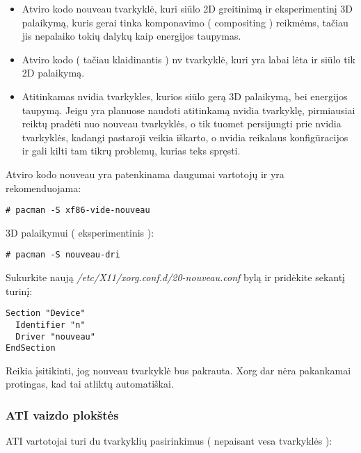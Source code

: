         \begin{itemize}
          \item Atviro kodo nouveau tvarkyklė, kuri siūlo 2D
            greitinimą ir eksperimentinį 3D palaikymą, kuris gerai
            tinka komponavimo ( compositing ) reikmėms, tačiau jis
            nepalaiko tokių dalykų kaip energijos taupymas.
          \item Atviro kodo ( tačiau klaidinantis ) nv tvarkyklė,
            kuri yra labai lėta ir siūlo tik 2D palaikymą.
          \item Atitinkamas nvidia tvarkykles, kurios siūlo gerą 3D
            palaikymą, bei energijos taupymą. Jeigu yra planuose
            naudoti atitinkamą nvidia tvarkyklę, pirmiausiai reiktų
            pradėti nuo nouveau tvarkyklės, o tik tuomet persijungti
            prie nvidia tvarkyklės, kadangi pastaroji veikia iškarto,
            o nvidia reikalaus konfigūracijos ir gali kilti tam tikrų
            problemų, kurias teks spręsti.
        \end{itemize}

        Atviro kodo nouveau yra patenkinama daugumai vartotojų ir yra
        rekomenduojama:

        \begin{verbatim}
# pacman -S xf86-vide-nouveau
        \end{verbatim}

        3D palaikymui ( eksperimentinis ):
        
        \begin{verbatim}
# pacman -S nouveau-dri
        \end{verbatim}

        Sukurkite naują \textsl{/etc/X11/xorg.conf.d/20-nouveau.conf}
        bylą ir pridėkite sekantį turinį:

        \begin{verbatim}
Section "Device"
  Identifier "n"
  Driver "nouveau"
EndSection
        \end{verbatim}

        Reikia įsitikinti, jog nouveau tvarkyklė bus pakrauta. Xorg
        dar nėra pakankamai protingas, kad tai atliktų automatiškai.

      \subsubsection{ATI vaizdo plokštės}

        ATI vartotojai turi du tvarkyklių pasirinkimus ( nepaisant
        vesa tvarkyklės ):

